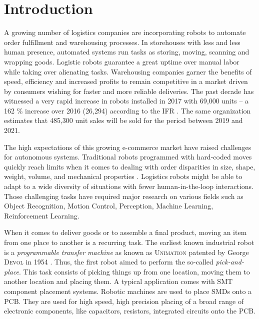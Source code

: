 \documentclass[/home/francois/latex/report/main.tex]{subfiles}
\begin{document}
\chapter{Introduction}
\label{chapter:introduction}

A growing number of logistics companies are incorporating robots to automate order fulfillment and warehousing processes. In storehouses with less and less human presence, automated systems run tasks as storing, moving, scanning and wrapping goods. Logistic robots guarantee a great uptime over manual labor while taking over alienating tasks. Warehousing companies garner the benefits of speed, efficiency and increased profits to remain competitive in a market driven by consumers wishing for faster and more reliable deliveries. The past decade has witnessed a very rapid increase in robots installed in 2017 with 69,000 units – a 162 \% increase over 2016 (26,294) according to the \ac{IFR} \cite{industrialRobot2018}. The same organization estimates that 485,300 unit sales will be sold for the period between 2019 and 2021.

The high expectations of this growing e-commerce market have raised challenges for autonomous systems. Traditional robots programmed with hard-coded moves quickly reach limits when it comes to dealing with order disparities in size, shape, weight, volume, and mechanical properties \cite{GQHuang2015}. Logistics robots might be able to adapt to a wide diversity of situations with fewer human-in-the-loop interactions. Those challenging tasks have required major research on various fields such as Object Recognition, Motion Control, Perception, Machine Learning, Reinforcement Learning.

When it comes to deliver goods or to assemble a final product, moving an item from one place to another is a recurring task. The earliest known industrial robot is a \textit{programmable transfer machine} as known as \textsc{Unimation} patented by George \textsc{Devol} in 1954 \cite{Wallen2008}. Thus, the first robot aimed to perform the so-called \textit{pick-and-place}. This task consists of picking things up from one location, moving them to another location and placing them. A typical application comes with \ac{SMT} component placement systems. Robotic machines are used to place \ac{SMDs} onto a \ac{PCB}. They are used for high speed, high precision placing of a broad range of electronic components, like capacitors, resistors, integrated circuits onto the \ac{PCB}.
\end{document}
